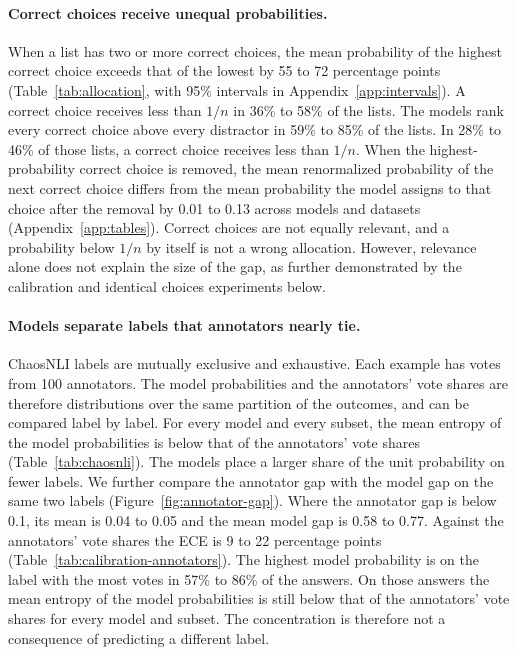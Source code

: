 \paragraph{Correct choices receive unequal probabilities.}
When a list has two or more correct choices, the mean probability of the highest correct choice exceeds that of the lowest by 55 to 72 percentage points (Table~\ref{tab:allocation}, with 95\% intervals in Appendix~\ref{app:intervals}). A correct choice receives less than $1/n$ in 36\% to 58\% of the lists. The models rank every correct choice above every distractor in 59\% to 85\% of the lists. In 28\% to 46\% of those lists, a correct choice receives less than $1/n$. When the highest-probability correct choice is removed, the mean renormalized probability of the next correct choice differs from the mean probability the model assigns to that choice after the removal by 0.01 to 0.13 across models and datasets (Appendix~\ref{app:tables}). Correct choices are not equally relevant, and a probability below $1/n$ by itself is not a wrong allocation. However, relevance alone does not explain the size of the gap, as further demonstrated by the calibration and identical choices experiments below.

\paragraph{Models separate labels that annotators nearly tie.}
ChaosNLI labels are mutually exclusive and exhaustive. Each example has votes from 100 annotators. The model probabilities and the annotators' vote shares are therefore distributions over the same partition of the outcomes, and can be compared label by label. For every model and every subset, the mean entropy of the model probabilities is below that of the annotators' vote shares (Table~\ref{tab:chaosnli}). The models place a larger share of the unit probability on fewer labels. We further compare the annotator gap with the model gap on the same two labels (Figure~\ref{fig:annotator-gap}). Where the annotator gap is below 0.1, its mean is 0.04 to 0.05 and the mean model gap is 0.58 to 0.77. Against the annotators' vote shares the ECE is 9 to 22 percentage points (Table~\ref{tab:calibration-annotators}). The highest model probability is on the label with the most votes in 57\% to 86\% of the answers. On those answers the mean entropy of the model probabilities is still below that of the annotators' vote shares for every model and subset. The concentration is therefore not a consequence of predicting a different label.

